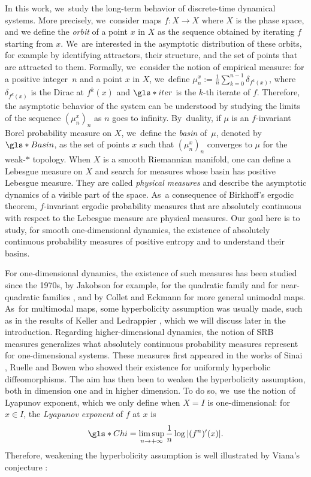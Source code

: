 \documentclass[10pt]{amsart}
\theoremstyle{definition}
\begin{document}
In this work, we~study the long-term behavior of discrete-time dynamical systems.
More precisely, we~consider maps $f : X \to X$ where $X$ is the phase space,
and we define the \textit{orbit} of a point $x$ in $X$ as the sequence obtained by iterating $f$ starting from $x$. We~are interested in the asymptotic distribution of these orbits, for \hbox{example} by identifying attractors, their structure, and the set of points that are attracted to them.
Formally, we~consider the notion of empirical measure: for a positive integer~$n$ and a point $x$ in $X$, we~define $\mu_n^x := \frac{1}{n} \sum_{k=0}^{n-1} \delta_{f^k(x)}$, where $\delta_{f^k(x)}$ is the Dirac at $f^k(x)$ and $\gls*{iter}$ is the $k$-th iterate of $f$.
Therefore, the asymptotic behavior of the system can be understood by studying the limits of the sequence $(\mu_n^x)_{n}$ as $n$ goes to infinity. By~duality, if $\mu$ is an $f$\nobreakdash-invariant Borel probability measure on $X$, we~define the \textit{basin} of~$\mu$, denoted by $\gls*{Basin}$, as the set of points $x$ such that $\left (\mu_n^x \right)_n$ converges to $\mu$ for the weak\nobreakdash-$*$ topology.
When $X$ is a smooth Riemannian manifold, one can define a Lebesgue measure on $X$ and search for measures whose basin has positive Lebesgue measure. They are called \textit{physical measures} and describe the asymptotic dynamics of a visible part of the space. As~a consequence of Birkhoff's ergodic theorem, $f$\nobreakdash-invariant ergodic probability measures that are absolutely continuous with respect to the Lebesgue measure are physical measures.
Our goal here is to study, for smooth one-dimensional dynamics, the existence of absolutely continuous probability measures of positive entropy and to understand their basins.

For one-dimensional dynamics, the existence of such measures has been studied since the 1970s,
by Jakobson for example, for the quadratic family \cite{Jakobson1980} and for near-quadratic families \cite{Jakobson1981}, and by Collet and Eckmann \cite{ColletEckmann} for more general unimodal maps. As~for multimodal maps, some hyperbolicity assumption was usually made, such as in the results of Keller \cite{Keller_1990} and Ledrappier \cite{Ledrappier_1981}, which we will discuss later in the introduction.
Regarding higher-dimensional dynamics, the notion of SRB measures generalizes what absolutely continuous probability measures represent for one-dimensional systems. These measures first appeared in the works of Sinai \cite{Sinai_1972}, Ruelle \cite{Ruelle_1978,Ruelle_1976} and Bowen \cite{Bowen_1975} who showed their existence for uniformly hyperbolic diffeomorphisms.
The aim has then been to weaken the hyperbolicity assumption, both in dimension one and in higher dimension.
To do so, we~use the notion of Lyapunov exponent, which we only define when $X=I$ is one-dimensional: for $x \in I$, the \textit{Lyapunov exponent} of $f$ at $x$ is
\[
\gls*{Chi} = \limsup_{n \to +\infty} \frac{1}{n} \log |(f^n)'(x)|.
\]
Therefore, weakening the hyperbolicity assumption is well illustrated by Viana's conjecture \cite{Viana1998DynamicsAP}:
\end{document}
